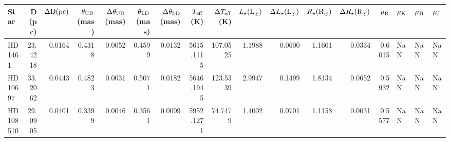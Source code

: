 \begin{tabular}{lrrrrrrrrrrrrrlll}
\toprule
Star & D (pc) & $\Delta \rm D (pc)$ & $\theta_{\rm UD}$ (mas) & $\Delta\theta_{\rm UD}$ (mas) & $\theta_{\rm LD}$ (mas) & $\Delta\theta_{\rm LD}$ (mas) & $T_{\rm eff}$ (K) & $\Delta T_{\rm eff}$ (K) & $L_{\star} (\rm L_{\odot})$ & $\Delta L_{\star} (\rm L_{\odot})$ & $R_{\star} (\rm R_{\odot})$ & $\Delta R_{\star} (\rm R_{\odot})$ & $\mu_{\rm R}$ & $\mu_{\rm K}$ & $\mu_{\rm H}$ & $\mu_{\rm J}$ \\
\midrule
HD 1461 & 23.4218 & 0.0164 & 0.4318 & 0.0052 & 0.4599 & 0.0132 & 5615.1115 & 107.0525 & 1.1988 & 0.0600 & 1.1601 & 0.0334 & 0.6015 & NaN & NaN & NaN \\
HD 10697 & 33.2062 & 0.0443 & 0.4823 & 0.0031 & 0.5071 & 0.0182 & 5646.1945 & 123.5339 & 2.9947 & 0.1499 & 1.8134 & 0.0652 & 0.5932 & NaN & NaN & NaN \\
HD 108510 & 29.0905 & 0.0401 & 0.3399 & 0.0046 & 0.3561 & 0.0009 & 5952.1271 & 74.7479 & 1.4002 & 0.0701 & 1.1158 & 0.0031 & 0.5577 & NaN & NaN & NaN \\
\bottomrule
\end{tabular}
